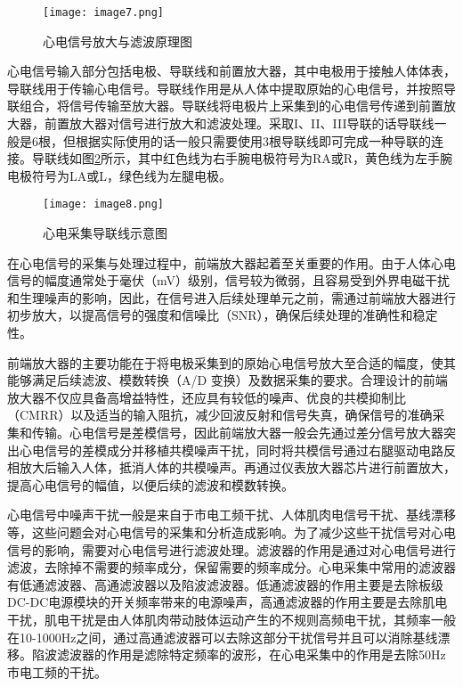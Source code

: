 \begin{figure}[H]
    \centering
    \texttt{[image: image7.png]}
    \caption{心电信号放大与滤波原理图}
    \label{F.ECG_image7}
\end{figure}

心电信号输入部分包括电极、导联线和前置放大器，其中电极用于接触人体体表，导联线用于传输心电信号。导联线作用是从人体中提取原始的心电信号，并按照导联组合，将信号传输至放大器。导联线将电极片上采集到的心电信号传递到前置放大器，前置放大器对信号进行放大和滤波处理。采取I、II、III导联的话导联线一般是6根，但根据实际使用的话一般只需要使用3根导联线即可完成一种导联的连接。导联线如图\ref{F.ECG_image8}所示，其中红色线为右手腕电极符号为RA或R，黄色线为左手腕电极符号为LA或L，绿色线为左腿电极。

\begin{figure}[hbt]
    \centering
    \texttt{[image: image8.png]}
    \caption{心电采集导联线示意图}
    \label{F.ECG_image8}
\end{figure}

在心电信号的采集与处理过程中，前端放大器起着至关重要的作用。由于人体心电信号的幅度通常处于毫伏（mV）级别，信号较为微弱，且容易受到外界电磁干扰和生理噪声的影响，因此，在信号进入后续处理单元之前，需通过前端放大器进行初步放大，以提高信号的强度和信噪比（SNR），确保后续处理的准确性和稳定性。

前端放大器的主要功能在于将电极采集到的原始心电信号放大至合适的幅度，使其能够满足后续滤波、模数转换（A/D 变换）及数据采集的要求。合理设计的前端放大器不仅应具备高增益特性，还应具有较低的噪声、优良的共模抑制比（CMRR）以及适当的输入阻抗，减少回波反射和信号失真，确保信号的准确采集和传输。心电信号是差模信号，因此前端放大器一般会先通过差分信号放大器突出心电信号的差模成分并移植共模噪声干扰，同时将共模信号通过右腿驱动电路反相放大后输入人体，抵消人体的共模噪声。再通过仪表放大器芯片进行前置放大，提高心电信号的幅值，以便后续的滤波和模数转换。

心电信号中噪声干扰一般是来自于市电工频干扰、人体肌肉电信号干扰、基线漂移等，这些问题会对心电信号的采集和分析造成影响。为了减少这些干扰信号对心电信号的影响，需要对心电信号进行滤波处理。滤波器的作用是通过对心电信号进行滤波，去除掉不需要的频率成分，保留需要的频率成分。心电采集中常用的滤波器有低通滤波器、高通滤波器以及陷波滤波器。低通滤波器的作用主要是去除板级DC-DC电源模块的开关频率带来的电源噪声，高通滤波器的作用主要是去除肌电干扰，肌电干扰是由人体肌肉带动肢体运动产生的不规则高频电干扰，其频率一般在10-1000Hz之间，通过高通滤波器可以去除这部分干扰信号并且可以消除基线漂移。陷波滤波器的作用是滤除特定频率的波形，在心电采集中的作用是去除50Hz市电工频的干扰。

